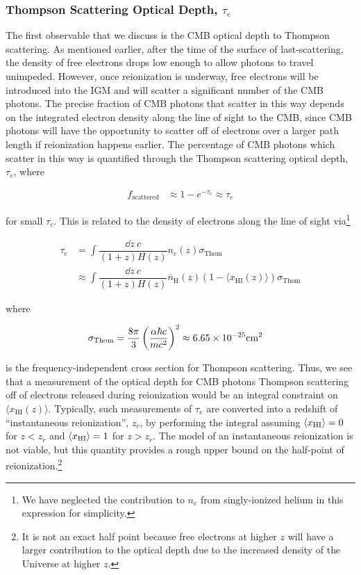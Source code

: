 \subsubsection{Thompson Scattering Optical Depth, $\tau_{e}$}


The first observable that we discuss is the CMB optical depth to Thompson scattering. As mentioned earlier, after the time of the surface of last-scattering, the density of free electrons drops low enough to allow photons to travel unimpeded. However, once reionization is underway, free electrons will be introduced into the IGM and will scatter a significant number of the CMB photons. The precise fraction of CMB photons that scatter in this way depends on the integrated electron density along the line of sight to the CMB, since CMB photons will have the opportunity to scatter off of electrons over a larger path length if reionization happens earlier. The percentage of CMB photons which scatter in this way is quantified through the Thompson scattering optical depth, $\tau_{e}$, where

\begin{align}
f_{\text{scattered}} &\approx 1-e^{-\tau_{e}} \approx \tau_{e}
\end{align}

for small $\tau_{e}$. This is related to the density of electrons along the line of sight via\footnote{We have neglected the contribution to $n_e$ from singly-ionized helium in this expression for simplicity.}

\begin{align}
\tau_{e} &= \int \dfrac{\dd z\ c}{(1+z)H(z)}n_{e}(z)\sigma_{\text{Thom}}\\
&\approx \int \dfrac{\dd z\ c}{(1+z)H(z)} \bar{n}_{\text{H}}(z)(1 - \langle x_{\text{HI}}(z)\rangle) \sigma_{\text{Thom}}
\end{align}

where 

\begin{align}
\sigma_{\text{Thom}} &= \dfrac{8\pi}{3}\left(\dfrac{\alpha \hbar c}{mc^2}\right)^2 \approx 6.65\times 10^{-25}\text{cm}^{2}
\end{align}

is the frequency-independent cross section for Thompson scattering. Thus, we see that a measurement of the optical depth for CMB photons Thompson scattering off of electrons released during reionization would be an integral constraint on $\langle x_{\text{HI}}(z)\rangle$. Typically, such measurements of $\tau_{e}$ are converted into a redshift of ``instantaneous reionization'', $z_{r}$, by performing the integral assuming $\langle x_{\text{HI}}\rangle = 0$ for $z < z_{r}$ and $\langle x_{\text{HI}}\rangle = 1$ for $z > z_r$. The model of an instantaneous reionization is not viable, but this quantity provides a rough upper bound on the half-point of reionization.\footnote{It is not an exact half point because free electrons at higher $z$ will have a larger contribution to the optical depth due to the increased density of the Universe at higher $z$.} 


